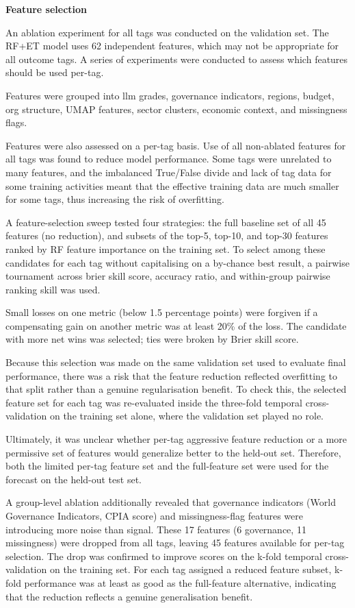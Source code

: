 \textbf{Feature selection}

An ablation experiment for all tags was conducted on the validation set. The RF+ET model uses 62 independent features, which may not be appropriate for all outcome tags. A series of experiments were conducted to assess which features should be used per-tag.

Features were grouped into llm grades, governance indicators, regions, budget, org structure, UMAP features, sector clusters, economic context, and missingness flags.

Features were also assessed on a per-tag basis. Use of all non-ablated features for all tags was found to reduce model performance. Some tags were unrelated to many features, and the imbalanced True/False divide and lack of tag data for some training activities meant that the effective training data are much smaller for some tags, thus increasing the risk of overfitting.

A feature-selection sweep tested four strategies: the full baseline set of all 45 features (no reduction), and subsets of the top-5, top-10, and top-30 features ranked by RF feature importance on the training set. To select among these candidates for each tag without capitalising on a by-chance best result, a pairwise tournament across brier skill score, accuracy ratio, and within-group pairwise ranking skill was used. 

Small losses on one metric (below 1.5 percentage points) were forgiven if a compensating gain on another metric was at least 20\% of the loss. The candidate with more net wins was selected; ties were broken by Brier skill score.

Because this selection was made on the same validation set used to evaluate final performance, there was a risk that the feature reduction reflected overfitting to that split rather than a genuine regularisation benefit. To check this, the selected feature set for each tag was re-evaluated inside the three-fold temporal cross-validation on the training set alone, where the validation set played no role. 

Ultimately, it was unclear whether per-tag aggressive feature reduction or a more permissive set of features would generalize better to the held-out set. Therefore, both the limited per-tag feature set and the full-feature set were used for the forecast on the held-out test set.

A group-level ablation additionally revealed that governance indicators (World Governance Indicators, CPIA score) and missingness-flag features were introducing more noise than signal. These 17 features (6 governance, 11 missingness) were dropped from all tags, leaving 45 features available for per-tag selection. The drop was confirmed to improve scores on the k-fold temporal cross-validation on the training set. For each tag assigned a reduced feature subset, k-fold performance was at least as good as the full-feature alternative, indicating that the reduction reflects a genuine generalisation benefit.

